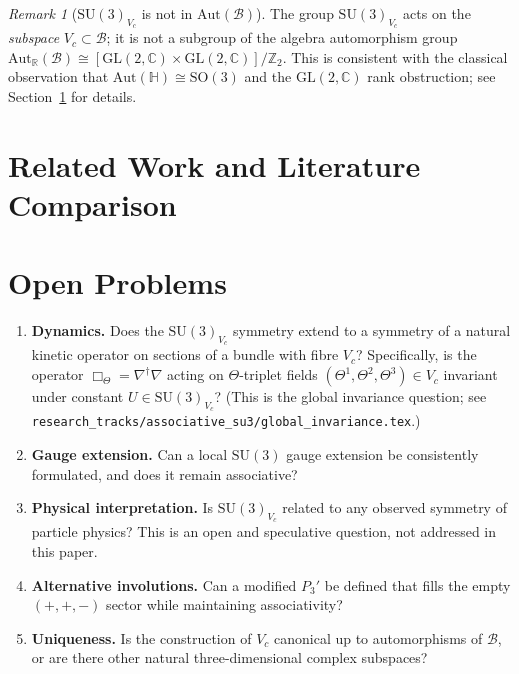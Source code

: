 \documentclass[12pt,a4paper]{article}
\theoremstyle{remark}
\newtheorem{remark}[theorem]{Remark}
\newcommand{\B}{\mathcal{B}}          %
\newcommand{\C}{\mathbb{C}}
\newcommand{\R}{\mathbb{R}}
\newcommand{\H}{\mathbb{H}}
\begin{document}
\begin{remark}[$\mathrm{SU}(3)_{V_c}$ is not in $\mathrm{Aut}(\B)$]
  \label{rem:not_aut}
  The group $\mathrm{SU}(3)_{V_c}$ acts on the \emph{subspace} $V_c\subset\B$;
  it is not a subgroup of the algebra automorphism group
  $\mathrm{Aut}_\R(\B)\cong[\mathrm{GL}(2,\C)\times\mathrm{GL}(2,\C)]/\mathbb{Z}_2$.
  This is consistent with the classical observation that
  $\mathrm{Aut}(\H)\cong\mathrm{SO}(3)$ and the $\mathrm{GL}(2,\C)$ rank
  obstruction; see Section~\ref{sec:related} for details.
\end{remark}

\section{Related Work and Literature Comparison}
\label{sec:related}



\section{Open Problems}
\label{sec:open_problems}

\begin{enumerate}
  \item \textbf{Dynamics.}  Does the $\mathrm{SU}(3)_{V_c}$ symmetry extend
    to a symmetry of a natural kinetic operator on sections of a bundle with
    fibre $V_c$?  Specifically, is the operator
    $\Box_\Theta = \nabla^\dagger\nabla$ acting on $\Theta$-triplet fields
    $(\Theta^1,\Theta^2,\Theta^3)\in V_c$ invariant under constant
    $U\in\mathrm{SU}(3)_{V_c}$?  (This is the global invariance question;
    see \texttt{research\_tracks/associative\_su3/global\_invariance.tex}.)

  \item \textbf{Gauge extension.}  Can a local $\mathrm{SU}(3)$ gauge
    extension be consistently formulated, and does it remain associative?

  \item \textbf{Physical interpretation.}  Is $\mathrm{SU}(3)_{V_c}$ related
    to any observed symmetry of particle physics?  This is an open and
    speculative question, not addressed in this paper.

  \item \textbf{Alternative involutions.}  Can a modified $P_3'$ be defined
    that fills the empty $(+,+,-)$ sector while maintaining associativity?

  \item \textbf{Uniqueness.}  Is the construction of $V_c$ canonical up to
    automorphisms of $\B$, or are there other natural three-dimensional
    complex subspaces?
\end{enumerate}
\end{document}
